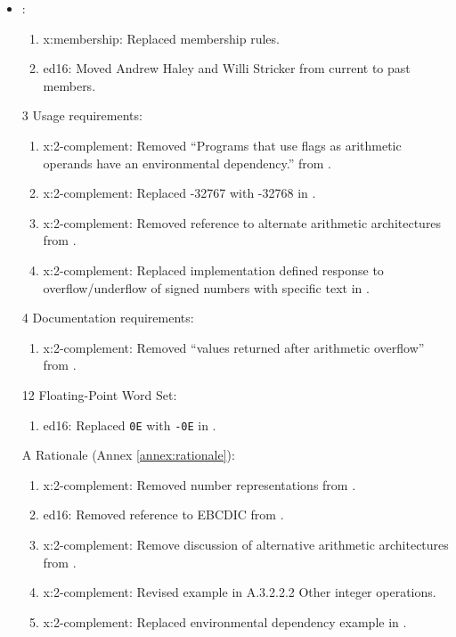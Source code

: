 	\begin{itemize}
	\item {}:						%
		\begin{enumerate}
		\item \textsf{x:membership}: Replaced membership rules.
		\item \textsf{ed16}: Moved Andrew Haley and Willi Stricker from current to past members.
		\end{enumerate}

	\item[3] Usage requirements:					%
	\begin{enumerate}
		\item \textsf{x:2-complement}: Removed ``Programs that use flags as arithmetic operands have an environmental dependency.'' from .
		\item \textsf{x:2-complement}: Replaced -32767 with -32768 in .
		\item \textsf{x:2-complement}: Removed reference to alternate arithmetic  architectures from .
		\item \textsf{x:2-complement}: Replaced implementation defined response to overflow/underflow of signed numbers with specific text in .
	\end{enumerate}

	\item[4] Documentation requirements:			%
		\begin{enumerate}
		\item \textsf{x:2-complement}:
			Removed ``values returned after arithmetic overflow''
			from .
		\end{enumerate}

	\item[12] Floating-Point Word Set:				%
		\begin{enumerate}
		\item \textsf{ed16}: Replaced \texttt{0E} with \texttt{-0E} in  .
		\end{enumerate}

	\item[A] Rationale (Annex \ref{annex:rationale}):				%
		\begin{enumerate}
		\item \textsf{x:2-complement}: Removed number representations from .
		\item \textsf{ed16}: Removed reference to EBCDIC from .
		\item \textsf{x:2-complement}: Remove discussion of alternative arithmetic architectures from .
		\item \textsf{x:2-complement}: Revised example in A.3.2.2.2 Other integer operations.
		\item \textsf{x:2-complement}: Replaced environmental dependency example in  .


\end{enumerate}
\end{itemize}
